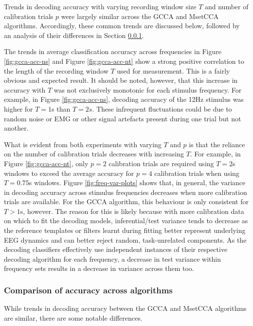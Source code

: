 Trends in decoding accuracy with varying recording window size $T$ and number of calibration trials $p$ were largely similar across the GCCA and MsetCCA algorithms. Accordingly, these common trends are discussed below, followed by an analysis of their differences in Section \ref{subsection:algo-comparison-results}.

The trends in average classification accuracy across frequencies in Figure \ref{fig:gcca-acc-ns} and Figure \ref{fig:gcca-acc-nt} show a strong positive correlation to the length of the recording window $T$ used for measurement. This is a fairly obvious and expected result. It should be noted, however, that this increase in accuracy with $T$ was not exclusively monotonic for each stimulus frequency. For example, in Figure \ref{fig:gcca-acc-ns}, decoding accuracy of the 12Hz stimulus was higher for $T=1$s than $T=2s$. These infrequent fluctuations could be due to random noise or EMG or other signal artefacts present during one trial but not another. 

What is evident from both experiments with varying $T$ and $p$ is that the reliance on the number of calibration trials decreases with increasing $T$. For example, in Figure \ref{fig:gcca-acc-nt}, only $p=2$ calibration trials are required using $T=2$s windows to exceed the average accuracy for $p=4$ calibration trials when using $T=0.75$s windows. Figure \ref{fig:freq-var-plots} shows that, in general, the variance in decoding accuracy across stimulus frequencies decreases when more calibration trials are available. For the GCCA algorithm, this behaviour is only consistent for $T>1$s, however. The reason for this is likely because with more calibration data on which to fit the decoding models, inferential/test variance tends to decrease as the reference templates or filters learnt during fitting better represent underlying EEG dynamics and can better reject random, task-unrelated components. As the decoding classifiers effectively use independent instances of their respective decoding algorithm for each frequency, a decrease in test variance within frequency sets results in a decrease in variance across them too.


\subsubsection{Comparison of accuracy across algorithms}
\label{subsection:algo-comparison-results}
While trends in decoding accuracy between the GCCA and MsetCCA algorithms are similar, there are some notable differences. 

